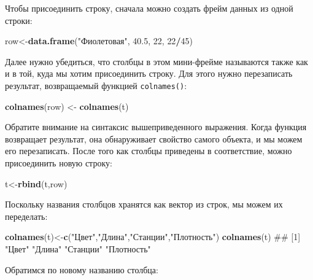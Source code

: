 \documentclass[]{book}
\newenvironment{Shaded}{\begin{snugshade}}{\end{snugshade}}
\newcommand{\KeywordTok}[1]{\textcolor[rgb]{0.13,0.29,0.53}{\textbf{#1}}}
\newcommand{\DecValTok}[1]{\textcolor[rgb]{0.00,0.00,0.81}{#1}}
\newcommand{\FloatTok}[1]{\textcolor[rgb]{0.00,0.00,0.81}{#1}}
\newcommand{\StringTok}[1]{\textcolor[rgb]{0.31,0.60,0.02}{#1}}
\newcommand{\OperatorTok}[1]{\textcolor[rgb]{0.81,0.36,0.00}{\textbf{#1}}}
\newcommand{\NormalTok}[1]{#1}
\begin{document}
Чтобы присоединить строку, сначала можно создать фрейм данных из одной
строки:

\begin{Shaded}
\begin{Highlighting}[]
\NormalTok{row<-}\KeywordTok{data.frame}\NormalTok{(}\StringTok{"Фиолетовая"}\NormalTok{, }\FloatTok{40.5}\NormalTok{, }\DecValTok{22}\NormalTok{, }\DecValTok{22}\OperatorTok{/}\DecValTok{45}\NormalTok{)}
\end{Highlighting}
\end{Shaded}

Далее нужно убедиться, что столбцы в этом мини-фрейме называются также
как и в той, куда мы хотим присоединить строку. Для этого нужно
перезаписать результат, возвращаемый функцией \texttt{colnames()}:

\begin{Shaded}
\begin{Highlighting}[]
\KeywordTok{colnames}\NormalTok{(row) <-}\StringTok{ }\KeywordTok{colnames}\NormalTok{(t)}
\end{Highlighting}
\end{Shaded}

Обратите внимание на синтаксис вышеприведенного выражения. Когда функция
возвращает результат, она обнаруживает свойство самого объекта, и мы
можем его перезаписать. После того как столбцы приведены в соответствие,
можно присоединить новую строку:

\begin{Shaded}
\begin{Highlighting}[]
\NormalTok{t<-}\KeywordTok{rbind}\NormalTok{(t,row)}
\end{Highlighting}
\end{Shaded}

Поскольку названия столбцов хранятся как вектор из строк, мы можем их
переделать:

\begin{Shaded}
\begin{Highlighting}[]
\KeywordTok{colnames}\NormalTok{(t)<-}\KeywordTok{c}\NormalTok{(}\StringTok{"Цвет"}\NormalTok{,}\StringTok{"Длина"}\NormalTok{,}\StringTok{"Станции"}\NormalTok{,}\StringTok{"Плотность"}\NormalTok{)}
\KeywordTok{colnames}\NormalTok{(t)}
\NormalTok{## [1] "Цвет"      "Длина"     "Станции"   "Плотность"}
\end{Highlighting}
\end{Shaded}

Обратимся по новому названию столбца:

\begin{Shaded}
\end{Shaded}
\end{document}
